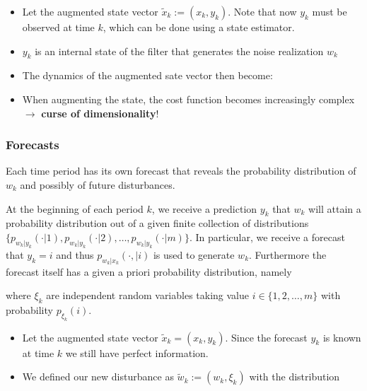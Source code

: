 \documentclass[10pt,a4paper]{scrartcl}
\begin{document}
\begin{multicols*}{2}
\begin{itemize}
\item Let the augmented state vector $\tilde{x}_k:=(x_k,y_k)$. Note that now $y_k$ must be observed at time $k$, which can be done using a state estimator.
\item $y_k$ is an internal state of the filter that generates the noise realization $w_k$
\item The dynamics of the augmented sate vector then become:


\item When augmenting the state, the cost function becomes increasingly complex $\rightarrow$ \textbf{curse of dimensionality}!
\end{itemize}

\subsubsection{Forecasts}

Each time period has its own forecast that reveals the probability distribution of $w_k$ and possibly of future disturbances.

At the beginning of each period $k$, we receive a prediction $y_k$ that $w_k$ will attain a probability distribution out of a given finite collection of distributions $\{p_{w_k|y_k}(\cdot|1),p_{w_k|y_k}(\cdot|2),\ldots,p_{w_k|y_k}(\cdot|m)\}$. In particular, we receive a forecast that $y_k=i$ and thus $p_{w_k|x_k}(\cdot,|i)$ is used to generate $w_k$. Furthermore the forecast itself has a given a priori probability distribution, namely


where $\xi_k$ are independent random variables taking value $i\in\{1,2,\ldots,m\}$ with probability $p_{\xi_k}(i)$.

\begin{itemize}
\item Let the augmented state vector $\tilde{x}_k=(x_k,y_k)$. Since the forecast $y_k$ is known at time $k$ we still have perfect information.
\item We defined our new disturbance as $\tilde{w}_k:=(w_k,\xi_k)$ with the distribution


\end{itemize}
\end{multicols*}
\end{document}
